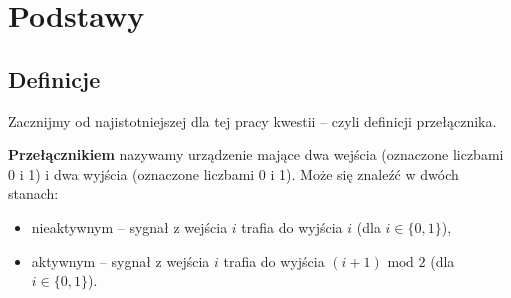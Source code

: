 \documentclass[a4paper]{article}
\renewcommand{\mod}{\,\, \text{mod} \,\,}
\theoremstyle{definition}
\begin{document}

\section{Podstawy}

\subsection{Definicje}

Zacznijmy od najistotniejszej dla tej pracy kwestii -- czyli definicji przełącznika.

\vspace{1em}

{\bf Przełącznikiem} nazywamy urządzenie mające dwa wejścia (oznaczone liczbami 0 i 1)  i dwa wyjścia (oznaczone liczbami 0 i 1). Może się znaleźć w dwóch stanach:

\begin{itemize}
    \item nieaktywnym -- sygnał z wejścia \(i\) trafia do wyjścia \(i\) (dla \(i \in \{0,1\}\)),
    \item  aktywnym -- sygnał z wejścia \(i\) trafia do wyjścia \((i+1) \mod 2\) (dla \(i \in \{0,1\}\)).
\end{itemize}
\end{document}
